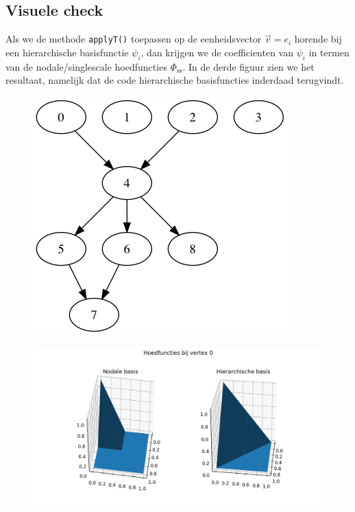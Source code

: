 \documentclass[11pt,a4paper]{amsart}
\theoremstyle{definition}
\begin{document}
\subsection*{Visuele check}
Als we de methode \texttt{applyT()} toepassen op de eenheidsvector $\vec v = e_i$
horende bij een hierarchische basisfunctie $\psi_i$, dan krijgen we de coefficienten
van $\psi_i$ in termen van de nodale/singlescale hoedfuncties $\Phi_{\text{ss}}$. In de derde figuur
zien we het resultaat, namelijk dat de code hierarchische basisfuncties inderdaad
terugvindt.
\begin{figure}
  \begin{minipage}{0.4\linewidth}
    \includegraphics[width=\linewidth]{img/vertex-tree.png}
  \end{minipage}
  \begin{minipage}{0.55\linewidth}
    \includegraphics[width=\linewidth]{img/h0.png}\\

\end{minipage}
\end{figure}
\end{document}
